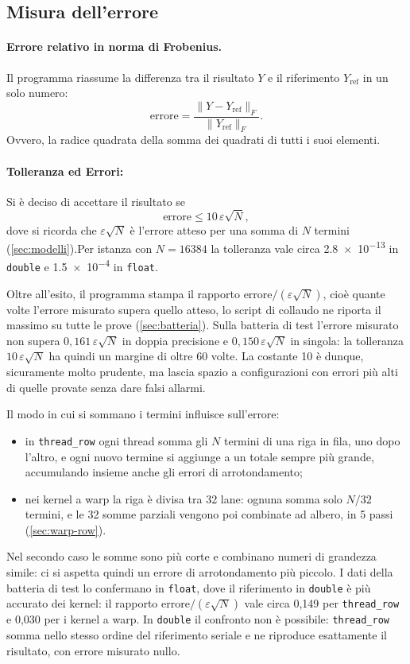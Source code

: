 \documentclass[11pt,a4paper]{article}
\begin{document}
\subsection{Misura dell'errore}\label{sec:errore}

\paragraph{Errore relativo in norma di Frobenius.} Il programma riassume la
differenza tra il risultato $Y$ e il riferimento $Y_{\text{ref}}$ in un solo
numero:
\[
  \text{errore} = \frac{\lVert Y - Y_{\text{ref}} \rVert_F}{\lVert Y_{\text{ref}} \rVert_F} .
\]
Ovvero, la radice quadrata della somma dei
quadrati di tutti i suoi elementi.

\paragraph{Tolleranza ed Errori:} Si è deciso di accettare il risultato se
\[
  \text{errore} \le 10\, \varepsilon \sqrt{N} ,
\]
dove si ricorda che $\varepsilon\sqrt{N}$ è l'errore atteso per una somma di $N$ termini
(\cref{sec:modelli}).Per istanza con $N = 16384$ la
tolleranza vale circa \num{2.8e-13} in \texttt{double} e \num{1.5e-4} in
\texttt{float}.

Oltre all'esito, il programma stampa il rapporto $\text{errore} / (\varepsilon\sqrt{N})$, cioè quante volte l'errore
misurato supera quello atteso, lo script di collaudo ne riporta il massimo su
tutte le prove (\cref{sec:batteria}).
Sulla batteria di test l'errore misurato non supera
$0{,}161\,\varepsilon\sqrt{N}$ in doppia precisione e
$0{,}150\,\varepsilon\sqrt{N}$ in singola: la tolleranza
$10\,\varepsilon\sqrt{N}$ ha quindi un margine di oltre 60 volte. La costante 10
è dunque, sicuramente molto prudente, ma lascia spazio a configurazioni con errori più alti di quelle
provate senza dare falsi allarmi.

Il modo in cui si sommano i termini influisce sull'errore:
\begin{itemize}
  \item in \texttt{thread\_row} ogni thread somma gli $N$ termini di una riga
        in fila, uno dopo l'altro, e ogni nuovo termine si aggiunge a un totale
        sempre più grande, accumulando insieme anche gli errori di arrotondamento;
  \item nei kernel a warp la riga è divisa tra 32 lane: ognuna somma solo
        $N/32$ termini, e le 32 somme parziali vengono poi combinate ad albero,
        in 5 passi (\cref{sec:warp-row}).
\end{itemize}
Nel secondo caso le somme sono più corte e combinano numeri di grandezza simile: ci si aspetta
quindi un errore di arrotondamento più piccolo. I dati della batteria di test
lo confermano in \texttt{float}, dove il riferimento in \texttt{double} è più
accurato dei kernel: il rapporto $\text{errore}/(\varepsilon\sqrt{N})$ vale
circa 0,149 per \texttt{thread\_row} e 0,030 per i kernel a warp. In
\texttt{double} il confronto non è possibile: \texttt{thread\_row} somma nello
stesso ordine del riferimento seriale e ne riproduce esattamente il risultato,
con errore misurato nullo.
\end{document}
